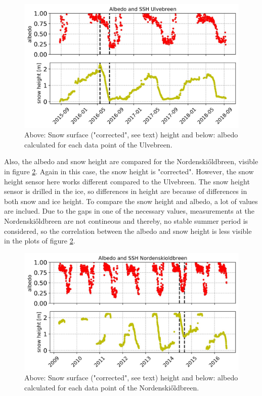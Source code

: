 \documentclass[11pt]{report}
\begin{document}
\begin{figure}[h]
\includegraphics[scale=1, width=1\textwidth]{Picture2.jpg}
\caption{Above: Snow surface ("corrected", see text) height and below: albedo calculated for each data point of the Ulvebreen.}
\label{fig:S2}
\end{figure}

Also, the albedo and snow height are compared for the Nordenski\H{o}ldbreen, visible in figure \ref{fig:S3}. Again in this case, the snow height is "corrected". However, the snow height sensor here works different compared to the Ulvebreen. The snow height sensor is drilled in the ice, so differences in height are because of differences in both snow and ice height. To compare the snow height and albedo, a lot of values are inclued. Due to the gaps in one of the necessary values, measurements at the Nordenski\H{o}ldbreen are not contineous and thereby, no stable summer period is considered, so the correlation between the albedo and snow height is less visible in the plots of figure \ref{fig:S3}.  

\begin{figure}[h]
\includegraphics[scale=1, width=1\textwidth]{Picture3.jpg}
\caption{Above: Snow surface ("corrected", see text) height and below: albedo calculated for each data point of the Nordenski\H{o}ldbreen.}
\label{fig:S3}
\end{figure}
\end{document}
